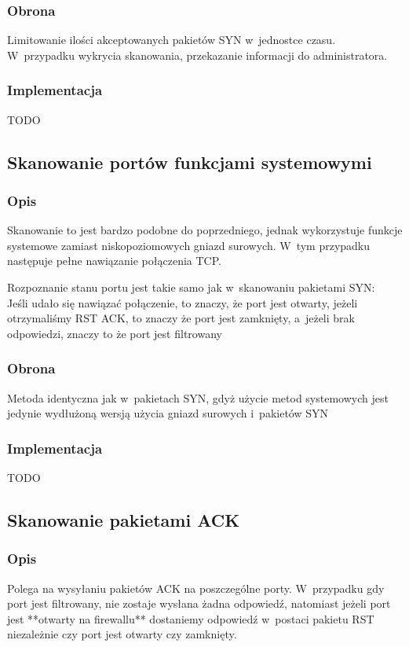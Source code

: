 \documentclass[a4paper,10pt]{article}
\begin{document}
		\subsubsection{Obrona}
			Limitowanie ilości akceptowanych pakietów SYN w~jednostce czasu. W~przypadku wykrycia skanowania, przekazanie informacji do administratora.
		\subsubsection{Implementacja}
			TODO
	\subsection{Skanowanie portów funkcjami systemowymi}
		\subsubsection{Opis}
			Skanowanie to jest bardzo podobne do poprzedniego, jednak wykorzystuje funkcje systemowe zamiast niskopoziomowych gniazd surowych. W~tym przypadku następuje pełne nawiązanie połączenia TCP.

			Rozpoznanie stanu portu jest takie samo jak w~skanowaniu pakietami SYN:\\
			Jeśli udało się nawiązać połączenie, to znaczy, że port jest otwarty, jeżeli otrzymaliśmy RST ACK, to znaczy że port jest zamknięty, a~jeżeli brak odpowiedzi, znaczy to że port jest filtrowany
		\subsubsection{Obrona}
			Metoda identyczna jak w~pakietach SYN, gdyż użycie metod systemowych jest jedynie wydłużoną wersją użycia gniazd surowych i~pakietów SYN
		\subsubsection{Implementacja}
			TODO
	\subsection{Skanowanie pakietami ACK}
		\subsubsection{Opis}
			Polega na wysyłaniu pakietów ACK na poszczególne porty. W~przypadku gdy port jest filtrowany, nie zostaje wysłana żadna odpowiedź, natomiast jeżeli port jest **otwarty na firewallu** dostaniemy odpowiedź w~postaci pakietu RST niezależnie czy port jest otwarty czy zamknięty.
\end{document}

